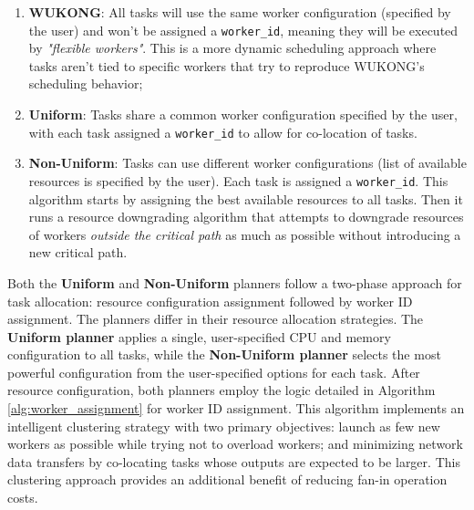 \documentclass[conference]{IEEEtran}
\begin{document}
\begin{enumerate}
    \item \textbf{WUKONG}: All tasks will use the same worker configuration (specified by the user) and won't be assigned a \texttt{worker\_id}, meaning they will be executed by \textit{"flexible workers"}. This is a more dynamic scheduling approach where tasks aren't tied to specific workers that try to reproduce WUKONG's scheduling behavior;
    \item \textbf{Uniform}: Tasks share a common worker configuration specified by the user, with each task assigned a \texttt{worker\_id} to allow for co-location of tasks.
    \item \textbf{Non-Uniform}: Tasks can use different worker configurations (list of available resources is specified by the user). Each task is assigned a \texttt{worker\_id}. This algorithm starts by assigning the best available resources to all tasks. Then it runs a resource downgrading algorithm that attempts to downgrade resources of workers \textit{outside the critical path} as much as possible without introducing a new critical path.
\end{enumerate}

Both the \textbf{Uniform} and \textbf{Non-Uniform} planners follow a two-phase approach for task allocation: resource configuration assignment followed by worker ID assignment. The planners differ in their resource allocation strategies. The \textbf{Uniform planner} applies a single, user-specified CPU and memory configuration to all tasks, while the \textbf{Non-Uniform planner} selects the most powerful configuration from the user-specified options for each task. After resource configuration, both planners employ the logic detailed in Algorithm \ref{alg:worker_assignment} for worker ID assignment. This algorithm implements an intelligent clustering strategy with two primary objectives: launch as few new workers as possible while trying not to overload workers; and minimizing network data transfers by co-locating tasks whose outputs are expected to be larger. This clustering approach provides an additional benefit of reducing fan-in operation costs.
\end{document}
